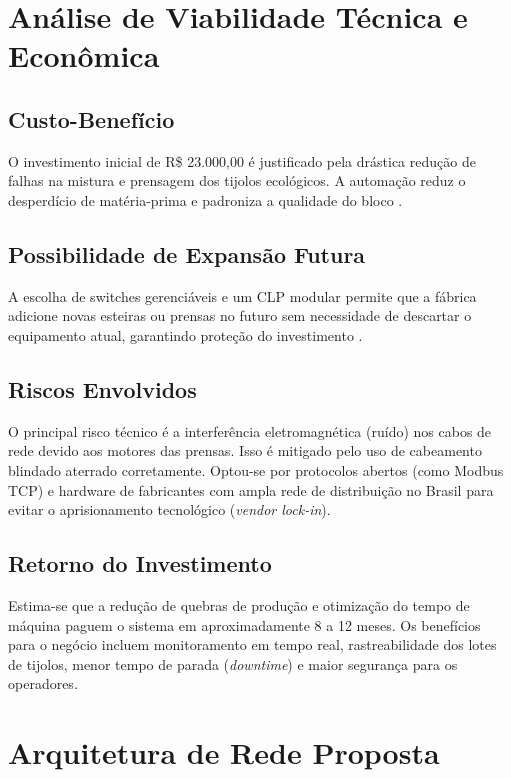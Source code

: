 \documentclass[12pt,a4paper,oneside]{article}
\begin{document}
\section{Análise de Viabilidade Técnica e Econômica}

\subsection{Custo-Benefício}

O investimento inicial de R\$ 23.000,00 é justificado pela drástica redução de falhas na mistura e prensagem dos tijolos ecológicos. A automação reduz o desperdício de matéria-prima e padroniza a qualidade do bloco \cite{cardoso2021}.

\subsection{Possibilidade de Expansão Futura}

A escolha de switches gerenciáveis e um CLP modular permite que a fábrica adicione novas esteiras ou prensas no futuro sem necessidade de descartar o equipamento atual, garantindo proteção do investimento \cite{lara2021}.

\subsection{Riscos Envolvidos}

O principal risco técnico é a interferência eletromagnética (ruído) nos cabos de rede devido aos motores das prensas. Isso é mitigado pelo uso de cabeamento blindado aterrado corretamente. Optou-se por protocolos abertos (como Modbus TCP) e hardware de fabricantes com ampla rede de distribuição no Brasil para evitar o aprisionamento tecnológico (\textit{vendor lock-in}).

\subsection{Retorno do Investimento}

Estima-se que a redução de quebras de produção e otimização do tempo de máquina paguem o sistema em aproximadamente 8 a 12 meses. Os benefícios para o negócio incluem monitoramento em tempo real, rastreabilidade dos lotes de tijolos, menor tempo de parada (\textit{downtime}) e maior segurança para os operadores.

\section{Arquitetura de Rede Proposta}
\end{document}

